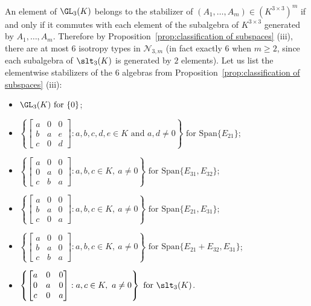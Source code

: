 \documentclass[12pt]{amsart}
\newcommand{\field}{K}
\begin{document}
An element of $\GL_3(\field)$ belongs to the stabilizer 
of $(A_1,\dots,A_m)\in (\field^{3\times 3})^m$ if and only if it 
commutes with each element of the subalgebra of $\field^{3\times 3}$ 
generated by $A_1,\dots,A_m$. 
Therefore by Proposition~\ref{prop:classification of subspaces} (iii), 
there are at most $6$ isotropy types in $\mathcal{N}_{3,m}$ 
(in fact exactly $6$ when $m\ge 2$, since each subalgebra of 
$\slt_3(\field)$ is generated by $2$ elements). 
Let us list the elementwise stabilizers of the $6$ algebras from 
Proposition~\ref{prop:classification of subspaces} (iii): 
\begin{itemize}
    \item $\GL_3(\field) \text{ for }\{0\}$;
    \item $\left\{ \begin{bmatrix}      a & 0 & 0 \\ 
                        b & a & e \\
                        c & 0 & d
        \end{bmatrix} : a, b, c, d, e \in \field \text{ and } a, d \neq 0 \right\}
\text{ for }\mathrm{Span}\{E_{21}\}$;
    \item $\left\{ \begin{bmatrix} a & 0 & 0 \\ 
                        0 & a & 0 \\
                        c & b & a
        \end{bmatrix} : a,b,c\in \field, \ a \neq 0 \right\}\text{ for }\mathrm{Span}\{E_{31},E_{32}\}$;
        \item $\left\{ \begin{bmatrix} a & 0 & 0 \\ 
                        b & a & 0 \\
                        c & 0 & a
        \end{bmatrix} : a,b,c\in \field, \ a \neq 0 \right\}\text{ for }\mathrm{Span}\{E_{21},E_{31}\}$;
        \item $\left\{ \begin{bmatrix} a & 0 & 0 \\ 
                        b & a & 0 \\
                        c & b & a
        \end{bmatrix} : a,b,c\in \field, \ a \neq 0 \right\}\text{ for }\mathrm{Span}\{E_{21}+E_{32},E_{31}\}$;
    \item $\left\{ \begin{bmatrix} a & 0 & 0 \\ 
                        0 & a & 0 \\
                        c & 0 & a
        \end{bmatrix} : a,c\in \field, \ a \neq 0 \right\}\text{ for }\slt_3(\field)$.
\end{itemize}
\end{document}
